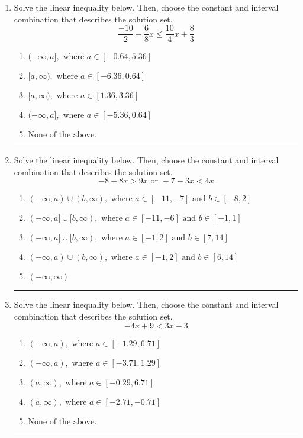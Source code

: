 \documentclass[14pt]{extbook}
\newcommand{\litem}[1]{\item#1\hspace*{-1cm}\rule{\textwidth}{0.4pt}}
\begin{document}
\begin{enumerate}
{\begin{enumerate}[label=\Alph*.]
\end{enumerate} }
\litem{
Solve the linear inequality below. Then, choose the constant and interval combination that describes the solution set.\[ \frac{-10}{2} - \frac{6}{8} x \leq \frac{10}{4} x + \frac{8}{3} \]\begin{enumerate}[label=\Alph*.]
\item \( (-\infty, a], \text{ where } a \in [-0.64, 5.36] \)
\item \( [a, \infty), \text{ where } a \in [-6.36, 0.64] \)
\item \( [a, \infty), \text{ where } a \in [1.36, 3.36] \)
\item \( (-\infty, a], \text{ where } a \in [-5.36, 0.64] \)
\item \( \text{None of the above}. \)

\end{enumerate} }
\litem{
Solve the linear inequality below. Then, choose the constant and interval combination that describes the solution set.\[ -8 + 8 x > 9 x \text{ or } -7 - 3 x < 4 x \]\begin{enumerate}[label=\Alph*.]
\item \( (-\infty, a) \cup (b, \infty), \text{ where } a \in [-11, -7] \text{ and } b \in [-8, 2] \)
\item \( (-\infty, a] \cup [b, \infty), \text{ where } a \in [-11, -6] \text{ and } b \in [-1, 1] \)
\item \( (-\infty, a] \cup [b, \infty), \text{ where } a \in [-1, 2] \text{ and } b \in [7, 14] \)
\item \( (-\infty, a) \cup (b, \infty), \text{ where } a \in [-1, 2] \text{ and } b \in [6, 14] \)
\item \( (-\infty, \infty) \)

\end{enumerate} }
\litem{
Solve the linear inequality below. Then, choose the constant and interval combination that describes the solution set.\[ -4x + 9 < 3x -3 \]\begin{enumerate}[label=\Alph*.]
\item \( (-\infty, a), \text{ where } a \in [-1.29, 6.71] \)
\item \( (-\infty, a), \text{ where } a \in [-3.71, 1.29] \)
\item \( (a, \infty), \text{ where } a \in [-0.29, 6.71] \)
\item \( (a, \infty), \text{ where } a \in [-2.71, -0.71] \)
\item \( \text{None of the above}. \)


\end{enumerate}}
\end{enumerate}
\end{document}
